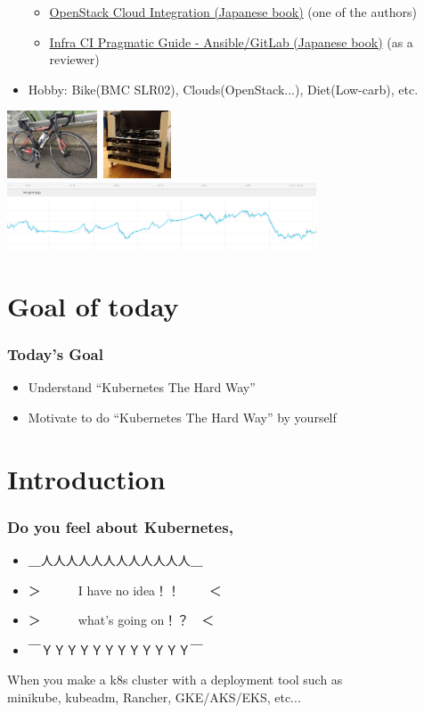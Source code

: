 \documentclass[aspectratio=169,11pt,hyperref={colorlinks=true}]{beamer}
\begin{document}
\begin{frame}
\begin{itemize}
      \begin{itemize}
      \item \href{https://www.amazon.co.jp/dp/4798139785/}{\scriptsize{OpenStack
        Cloud Integration (Japanese book)}} (one of the authors)
      \item \href{https://www.amazon.co.jp/dp/4798155128/}{\scriptsize{Infra CI
        Pragmatic Guide - Ansible/GitLab (Japanese book)}} (as a reviewer)
      \end{itemize}
    \item Hobby: Bike(BMC SLR02), Clouds(OpenStack...), Diet(Low-carb), etc.
  \end{itemize}
  \includegraphics[height=20mm]{images/my-bike.jpg}~\includegraphics[height=20mm]{images/server_front.jpg}~\includegraphics[height=20mm]{images/my-weight.png}
\end{frame}

\section{Goal of today}
\begin{frame}
  \frametitle{Today's Goal}
  \begin{itemize}
    \item Understand ``Kubernetes The Hard Way''
    \item Motivate to do ``Kubernetes The Hard Way'' by yourself
  \end{itemize}
\end{frame}

\section{Introduction}
\begin{frame}
  \frametitle{Do you feel about Kubernetes,}
  \begin{itemize}
    \item[] \Huge{＿人人人人人人人人人人人人＿}
    \item[] \Huge{＞　　　I have no idea！！ 　　＜}
    \item[] \Huge{＞　　　what's going on！？　＜}
    \item[] \Huge{￣ＹＹＹＹＹＹＹＹＹＹＹＹ￣}
  \end{itemize}
  When you make a k8s cluster with a deployment tool such as\\
  minikube, kubeadm, Rancher, GKE/AKS/EKS, etc...
\end{frame}
\end{document}
